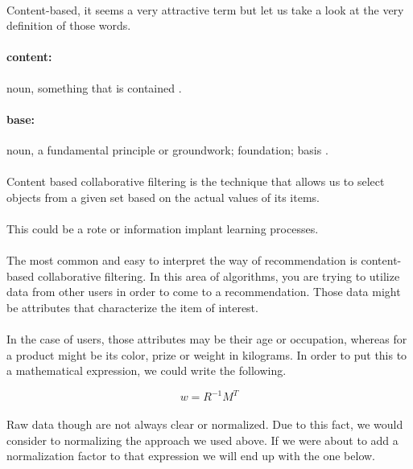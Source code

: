 \paragraph{} Content-based, it seems a very attractive term but let us take a look at the very definition of those words.
\paragraph{content:} noun, something that is contained \cite{Dictionary.com2017}.
\paragraph{base:} noun, a fundamental principle or groundwork; foundation; basis \cite{Dictionary.com2017}.

\paragraph{}Content based collaborative filtering is the technique that allows us to select objects from a given set based on the actual values of its items.
\paragraph{} This could be a rote or information implant learning processes.

\paragraph{}The most common and easy to interpret the way of recommendation is content-based collaborative filtering. In this area of algorithms, you are trying to utilize data from other users in order to come to a recommendation. Those data might be attributes that characterize the item of interest. 
\paragraph{}In the case of users, those attributes may be their age or occupation, whereas for a product might be its color, prize or weight in kilograms. In order to put this to a mathematical expression, we could write the following.

\begin{equation}
w=R^{-1}M^{T}
\end{equation}

\paragraph{}Raw data though are not always clear or normalized. Due to this fact, we would consider to normalizing the approach we used above. If we were about to add a normalization factor to that expression we will end up with the one below.

